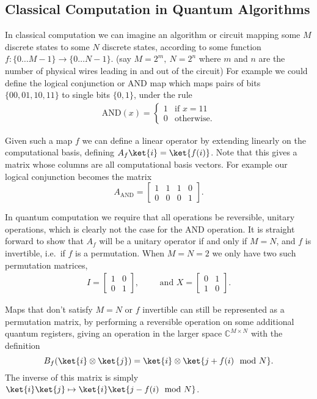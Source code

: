 \subsection{Classical Computation in Quantum Algorithms}
In classical computation we can imagine an algorithm or circuit mapping some $M$ discrete states to some $N$ discrete states, according to some function $f: \{0\dots M-1\} \to \{0\dots N-1\}$. (say $M = 2^m,\ N = 2^n$ where $m$ and $n$ are the number of physical wires leading in and out of the circuit) For example we could define the logical conjunction or AND map which maps pairs of bits $\{00, 01, 10, 11\}$ to single bits $\{0, 1\}$, under the rule
\begin{align*}
	\text{AND}(x) = \begin{cases}
		1 & \text{if\ } x = 11\\
		0 & \text{otherwise.}
	\end{cases}
\end{align*}

Given such a map $f$ we can define a linear operator by extending linearly on the computational basis, defining $A_f\ket{i} = \ket{f(i)}$. Note that this gives a matrix whose columns are all computational basis vectors. For example our logical conjunction becomes the matrix
\[
A_\text{AND} = \left[\begin{matrix}
	1&1&1&0\\
	0&0&0&1
\end{matrix}\right].
\]

In quantum computation we require that all operations be reversible, unitary operations, which is clearly not the case for the AND operation. It is straight forward to show that $A_f$ will be a unitary operator if and only if $M=N$, and $f$ is invertible, i.e.\ if $f$ is a permutation. When $M = N = 2$ we only have two such permutation matrices,
\begin{align*}
	I = \left[\begin{matrix}
		1&0\\
		0&1
	\end{matrix}\right],
	&&&
	\text{and\ }X = \left[\begin{matrix}
		0&1\\
		1&0
	\end{matrix}\right].
\end{align*}

Maps that don't satisfy $M = N$ or $f$ invertible can still be represented as a permutation matrix, by performing a reversible operation on some additional quantum registers, giving an operation in the larger space $\mathbb{C}^{M\times N}$ with the definition
\[B_f(\ket{i}\otimes\ket{j}) = \ket{i}\otimes\ket{j+f(i) \mod N}.\]
The inverse of this matrix is simply $\ket{i}\ket{j} \mapsto \ket{i}\ket{j-f(i) \mod N}$.

